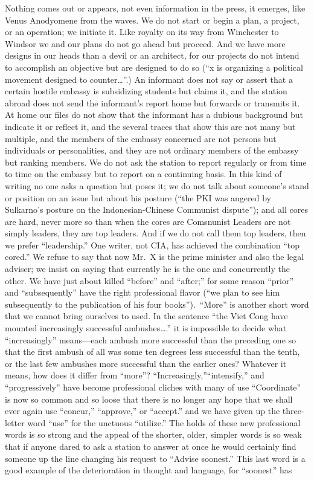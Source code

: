 \documentclass[
    oneside,
    11pt,
]{memoir}
\begin{document}
Nothing comes out or appears, not even information in the press, it emerges, like Venus Anodyomene from the waves. We do not start or begin a plan, a project, or an operation; we initiate it. Like royalty on its way from Winchester to Windsor we and our plans do not go ahead but proceed. And we have more designs in our heads than a devil or an architect, for our projects do not intend to accomplish an objective but are designed to do so (\enquote{x is organizing a political movement designed to counter\dots}.) An informant does not say or assert that a certain hostile embassy is subsidizing students but claims it, and the station abroad does not send the informant's report home but forwards or transmits it. At home our files do not show that the informant has a dubious background but indicate it or reflect it, and the several traces that show this are not many but multiple, and the members of the embassy concerned are not persons but individuals or personalities, and they are not ordinary members of the embassy but ranking members. We do not ask the station to report regularly or from time to time on the embassy but to report on a continuing basis. In this kind of writing no one asks a question but poses it; we do not talk about someone's stand or position on an issue but about his posture (\enquote{the PKI was angered by Sulkarno's posture on the Indonesian-Chinese Communist dispute}); and all cores are hard, never more so than when the cores are Comsnunist Leaders are not simply leaders, they are top leaders. And if we do not call them top leaders, then we prefer \enquote{leadership.} One writer, not CIA, has achieved the combination \enquote{top cored.} We refuse to say that now Mr.\ X is the prime minister and also the legal adviser; we insist on saying that currently he is the one and concurrently the other. We have just about killed \enquote{before} and \enquote{after;} for some reason \enquote{prior} and \enquote{subsequently} have the right professional flavor (\enquote{we plan to see him subsequently to the publication of his four books}).\ \enquote{More} is another short word that we cannot bring ourselves to used. In the sentence \enquote{the Viet Cong have mounted increasingly successful ambushes\dots.} it is impossible to decide what \enquote{increasingly} means---each ambush more successful than the preceding one so that the first ambush of all was some ten degrees less successful than the tenth, or the last few ambushes more successful than the earlier ones? Whatever it means, how does it differ from \enquote{more}? \enquote{Increasingly,}\enquote{intensify,} and \enquote{progressively} have become professional cliches with many of use \enquote{Coordinate} is now so common and so loose that there is no longer any hope that we shall ever again use \enquote{concur,} \enquote{approve,} or \enquote{accept.} and we have given up the three-letter word \enquote{use} for the unctuous \enquote{utilize.} The holds of these new professional words is so strong and the appeal of the shorter, older, simpler words is so weak that if anyone dared to ask a station to answer at once he would certainly find someone up the line changing his request to \enquote{Advise soonest.} This last word is a good example of the deterioration in thought and language, for \enquote{soonest} has 
\end{document}
